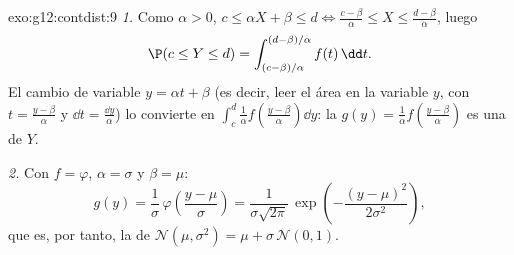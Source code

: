 \begin{solution}{exo:g12:contdist:9}
\emph{1.} Como $\alpha > 0$, $c \leq \alpha X + \beta \leq d
\iff \frac{c - \beta}{\alpha} \leq X \leq \frac{d - \beta}{\alpha}$, luego
\[
\P(c \leq Y \leq d)
= \int_{(c-\beta)/\alpha}^{(d-\beta)/\alpha} f(t)\,\dd t .
\]
El cambio de variable $y = \alpha t + \beta$ (es decir, leer el área en la
variable $y$, con $t = \frac{y - \beta}{\alpha}$ y
$\dd t = \frac{\dd y}{\alpha}$) lo convierte en
$\int_c^d \frac{1}{\alpha} f\left(\frac{y-\beta}{\alpha}\right)\dd y$: la
 $g(y) = \frac1\alpha f\left(\frac{y-\beta}{\alpha}\right)$ es una
 de $Y$.

\emph{2.} Con $f = \varphi$, $\alpha = \sigma$ y $\beta = \mu$:
\[
g(y) = \frac{1}{\sigma}\,\varphi\!\left(\frac{y - \mu}{\sigma}\right)
= \frac{1}{\sigma\sqrt{2\pi}}\,
\exp\left(-\frac{(y-\mu)^2}{2\sigma^2}\right),
\]
que es, por tanto, la  de
$\mathcal N(\mu, \sigma^2) = \mu + \sigma\,\mathcal N(0,1)$.
\end{solution}

